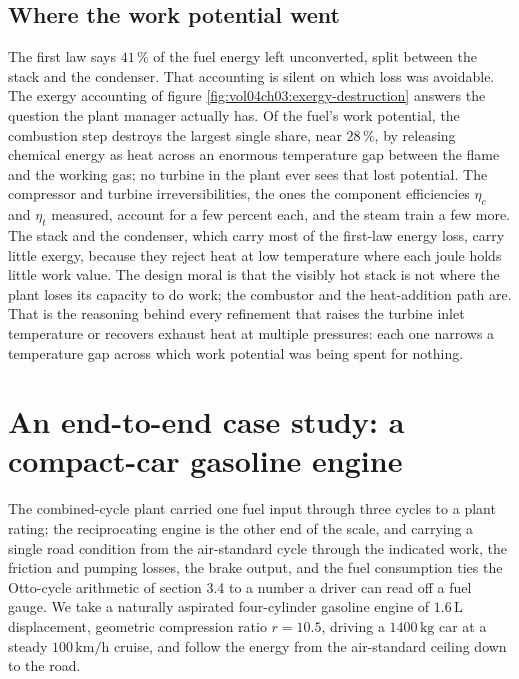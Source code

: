 \subsection{Where the work potential went}



The first law says $41\,\%$ of the fuel energy left unconverted, split
between the stack and the condenser. That accounting is silent on which
loss was avoidable. The exergy accounting of figure
\ref{fig:vol04ch03:exergy-destruction} answers the question the plant
manager actually has. Of the fuel's work potential, the combustion step
destroys the largest single share, near $28\,\%$, by releasing chemical
energy as heat across an enormous temperature gap between the flame and
the working gas; no turbine in the plant ever sees that lost potential.
The compressor and turbine irreversibilities, the ones the component
efficiencies $\eta_c$ and $\eta_t$ measured, account for a few percent
each, and the steam train a few more. The stack and the condenser, which
carry most of the first-law energy loss, carry little exergy, because
they reject heat at low temperature where each joule holds little work
value. The design moral is that the visibly hot stack is not where the
plant loses its capacity to do work; the combustor and the heat-addition
path are. That is the reasoning behind every refinement that raises the
turbine inlet temperature or recovers exhaust heat at multiple pressures:
each one narrows a temperature gap across which work potential was being
spent for nothing.

\section{An end-to-end case study: a compact-car gasoline engine}

The combined-cycle plant carried one fuel input through three cycles to a
plant rating; the reciprocating engine is the other end of the scale, and
carrying a single road condition from the air-standard cycle through the
indicated work, the friction and pumping losses, the brake output, and the
fuel consumption ties the Otto-cycle arithmetic of section 3.4 to a number a
driver can read off a fuel gauge. We take a naturally aspirated four-cylinder
gasoline engine of $1.6\,\text{L}$ displacement, geometric compression ratio
$r = 10.5$, driving a $1400\,\text{kg}$ car at a steady
$100\,\text{km}/\text{h}$ cruise, and follow the energy from the air-standard
ceiling down to the road.

